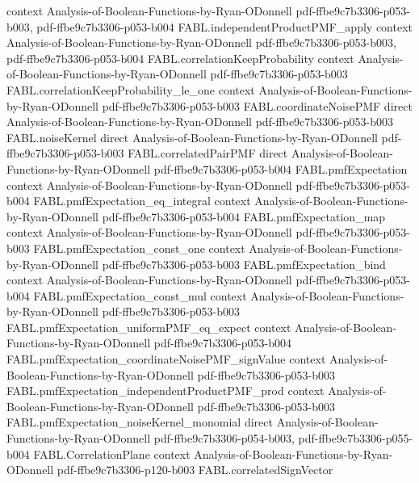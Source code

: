 \begin{theorem}
  {context}
  {Analysis-of-Boolean-Functions-by-Ryan-ODonnell}
  {pdf-ffbe9c7b3306-p053-b003,
    pdf-ffbe9c7b3306-p053-b004}
\proofstep
  {FABL.independentProductPMF_apply}
  {context}
  {Analysis-of-Boolean-Functions-by-Ryan-ODonnell}
  {pdf-ffbe9c7b3306-p053-b003,
    pdf-ffbe9c7b3306-p053-b004}
\proofstep
  {FABL.correlationKeepProbability}
  {context}
  {Analysis-of-Boolean-Functions-by-Ryan-ODonnell}
  {pdf-ffbe9c7b3306-p053-b003}
\proofstep
  {FABL.correlationKeepProbability_le_one}
  {context}
  {Analysis-of-Boolean-Functions-by-Ryan-ODonnell}
  {pdf-ffbe9c7b3306-p053-b003}
\proofstep
  {FABL.coordinateNoisePMF}
  {direct}
  {Analysis-of-Boolean-Functions-by-Ryan-ODonnell}
  {pdf-ffbe9c7b3306-p053-b003}
\proofstep
  {FABL.noiseKernel}
  {direct}
  {Analysis-of-Boolean-Functions-by-Ryan-ODonnell}
  {pdf-ffbe9c7b3306-p053-b003}
\proofstep
  {FABL.correlatedPairPMF}
  {direct}
  {Analysis-of-Boolean-Functions-by-Ryan-ODonnell}
  {pdf-ffbe9c7b3306-p053-b004}
\proofstep
  {FABL.pmfExpectation}
  {context}
  {Analysis-of-Boolean-Functions-by-Ryan-ODonnell}
  {pdf-ffbe9c7b3306-p053-b004}
\proofstep
  {FABL.pmfExpectation_eq_integral}
  {context}
  {Analysis-of-Boolean-Functions-by-Ryan-ODonnell}
  {pdf-ffbe9c7b3306-p053-b004}
\proofstep
  {FABL.pmfExpectation_map}
  {context}
  {Analysis-of-Boolean-Functions-by-Ryan-ODonnell}
  {pdf-ffbe9c7b3306-p053-b003}
\proofstep
  {FABL.pmfExpectation_const_one}
  {context}
  {Analysis-of-Boolean-Functions-by-Ryan-ODonnell}
  {pdf-ffbe9c7b3306-p053-b003}
\proofstep
  {FABL.pmfExpectation_bind}
  {context}
  {Analysis-of-Boolean-Functions-by-Ryan-ODonnell}
  {pdf-ffbe9c7b3306-p053-b004}
\proofstep
  {FABL.pmfExpectation_const_mul}
  {context}
  {Analysis-of-Boolean-Functions-by-Ryan-ODonnell}
  {pdf-ffbe9c7b3306-p053-b003}
\proofstep
  {FABL.pmfExpectation_uniformPMF_eq_expect}
  {context}
  {Analysis-of-Boolean-Functions-by-Ryan-ODonnell}
  {pdf-ffbe9c7b3306-p053-b004}
\proofstep
  {FABL.pmfExpectation_coordinateNoisePMF_signValue}
  {context}
  {Analysis-of-Boolean-Functions-by-Ryan-ODonnell}
  {pdf-ffbe9c7b3306-p053-b003}
\proofstep
  {FABL.pmfExpectation_independentProductPMF_prod}
  {context}
  {Analysis-of-Boolean-Functions-by-Ryan-ODonnell}
  {pdf-ffbe9c7b3306-p053-b003}
\proofstep
  {FABL.pmfExpectation_noiseKernel_monomial}
  {direct}
  {Analysis-of-Boolean-Functions-by-Ryan-ODonnell}
  {pdf-ffbe9c7b3306-p054-b003,
    pdf-ffbe9c7b3306-p055-b004}
\proofstep
  {FABL.CorrelationPlane}
  {context}
  {Analysis-of-Boolean-Functions-by-Ryan-ODonnell}
  {pdf-ffbe9c7b3306-p120-b003}
\proofstep
  {FABL.correlatedSignVector}

\end{theorem}
